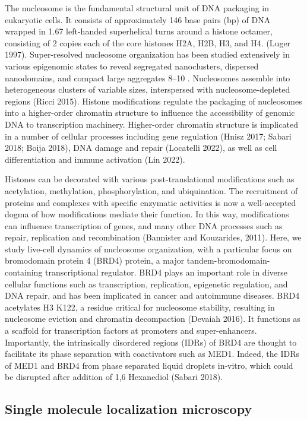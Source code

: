 \documentclass{ucetd}
\begin{document}
The nucleosome is the fundamental structural unit of DNA packaging in eukaryotic cells. It consists of approximately 146 base pairs (bp) of DNA wrapped in 1.67 left-handed superhelical turns around a histone octamer, consisting of 2 copies each of the core histones H2A, H2B, H3, and H4. (Luger 1997). Super-resolved nucleosome organization has been studied extensively in various epigenomic states to reveal segregated nanoclusters, dispersed nanodomains, and compact large aggregates  8–10 . Nucleosomes assemble into heterogeneous clusters of variable sizes, interspersed with nucleosome-depleted regions (Ricci 2015). Histone modiﬁcations regulate the packaging of nucleosomes into a higher-order chromatin structure to inﬂuence the accessibility of genomic DNA to transcription machinery. Higher-order chromatin structure is implicated in a number of cellular processes including gene regulation (Hnisz 2017; Sabari 2018; Boija 2018), DNA damage and repair (Locatelli 2022), as well as cell differentiation and immune activation (Lin 2022).


Histones can be decorated with various post-translational modifications such as acetylation, methylation, phosphorylation, and ubiquination. The recruitment of proteins and complexes with specific enzymatic activities is now a well-accepted dogma of how modifications mediate their function. In this way, modifications can influence transcription of genes, and many other DNA processes such as repair, replication and recombination (Bannister and Kouzarides, 2011). Here, we study live-cell dynamics of nucleosome organization, with a particular focus on bromodomain protein 4 (BRD4) protein, a major tandem-bromodomain-containing transcriptional regulator. BRD4 plays an important role in diverse cellular functions such as transcription, replication, epigenetic regulation, and DNA repair, and has been implicated in cancer and autoimmune diseases. BRD4 acetylates H3 K122, a residue critical for nucleosome stability, resulting in nucleosome eviction and chromatin decompaction (Devaiah 2016). It functions as a scaffold for transcription factors at promoters and super-enhancers. Importantly, the intrinsically disordered regions (IDRs) of BRD4 are thought to facilitate its phase separation with coactivators such as MED1. Indeed, the IDRs of MED1 and BRD4 from phase separated liquid droplets in-vitro, which could be disrupted after addition of 1,6 Hexanediol (Sabari 2018).  

\subsection{Single molecule localization microscopy}
\end{document}
